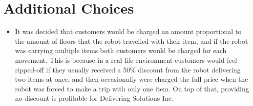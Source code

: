 \documentclass{article}
\begin{document}
\section{Additional Choices}
\begin{itemize}
    \item It was decided that customers would be charged an amount proportional to the amount of floors that the robot travelled with their item, and if the robot was carrying multiple items both customers would be charged for each movement. This is because in a real life environment customers would feel ripped-off if they usually received a 50\% discount from the robot delivering two items at once, and then occasionally were charged the full price when the robot was forced to make a trip with only one item. On top of that, providing no discount is profitable for Delivering Solutions Inc.
\end{itemize}


\end{document}
